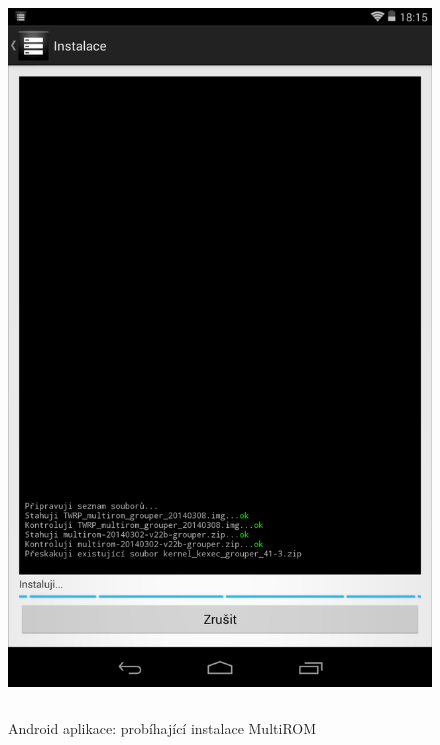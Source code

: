 \documentclass[12pt, a4paper, oneside]{article}
\begin{document}
\begin{figure}[H]
\begin{center}
 \includegraphics[height=550pt]{img/app_install.png}
\caption{Android aplikace: probíhající instalace MultiROM}
\end{center}
\end{figure}
\end{document}
